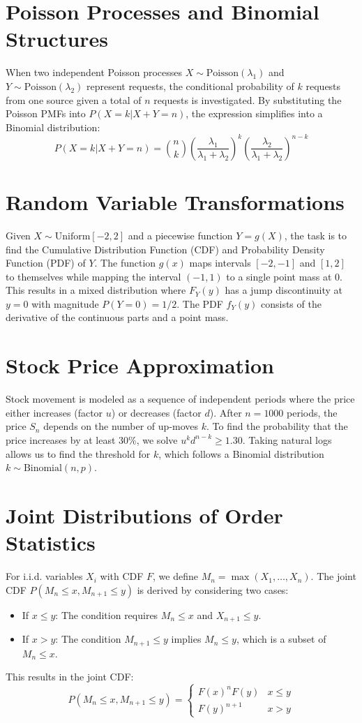 \documentclass[11pt]{article}
\begin{document}
\section{Poisson Processes and Binomial Structures}
When two independent Poisson processes $X \sim \text{Poisson}(\lambda_1)$ and $Y \sim \text{Poisson}(\lambda_2)$ represent requests, the conditional probability of $k$ requests from one source given a total of $n$ requests is investigated. By substituting the Poisson PMFs into $P(X=k | X+Y=n)$, the expression simplifies into a Binomial distribution:
$$P(X=k | X+Y=n) = \binom{n}{k} \left( \frac{\lambda_1}{\lambda_1 + \lambda_2} \right)^k \left( \frac{\lambda_2}{\lambda_1 + \lambda_2} \right)^{n-k}$$

\section{Random Variable Transformations}
Given $X \sim \text{Uniform}[-2, 2]$ and a piecewise function $Y=g(X)$, the task is to find the Cumulative Distribution Function (CDF) and Probability Density Function (PDF) of $Y$.
The function $g(x)$ maps intervals $[-2, -1]$ and $[1, 2]$ to themselves while mapping the interval $(-1, 1)$ to a single point mass at $0$. This results in a mixed distribution where $F_Y(y)$ has a jump discontinuity at $y=0$ with magnitude $P(Y=0) = 1/2$. The PDF $f_Y(y)$ consists of the derivative of the continuous parts and a point mass.

\section{Stock Price Approximation}
Stock movement is modeled as a sequence of independent periods where the price either increases (factor $u$) or decreases (factor $d$). After $n=1000$ periods, the price $S_n$ depends on the number of up-moves $k$. To find the probability that the price increases by at least 30\%, we solve $u^k d^{n-k} \ge 1.30$. Taking natural logs allows us to find the threshold for $k$, which follows a Binomial distribution $k \sim \text{Binomial}(n, p)$.

\section{Joint Distributions of Order Statistics}
For i.i.d. variables $X_i$ with CDF $F$, we define $M_n = \max(X_1, \dots, X_n)$. The joint CDF $P(M_n \le x, M_{n+1} \le y)$ is derived by considering two cases:
\begin{itemize}
    \item If $x \le y$: The condition requires $M_n \le x$ and $X_{n+1} \le y$.
    \item If $x > y$: The condition $M_{n+1} \le y$ implies $M_n \le y$, which is a subset of $M_n \le x$.
\end{itemize}
This results in the joint CDF:
$$P(M_n \le x, M_{n+1} \le y) = \begin{cases} F(x)^n F(y) & x \le y \\ F(y)^{n+1} & x > y \end{cases}$$
\end{document}
